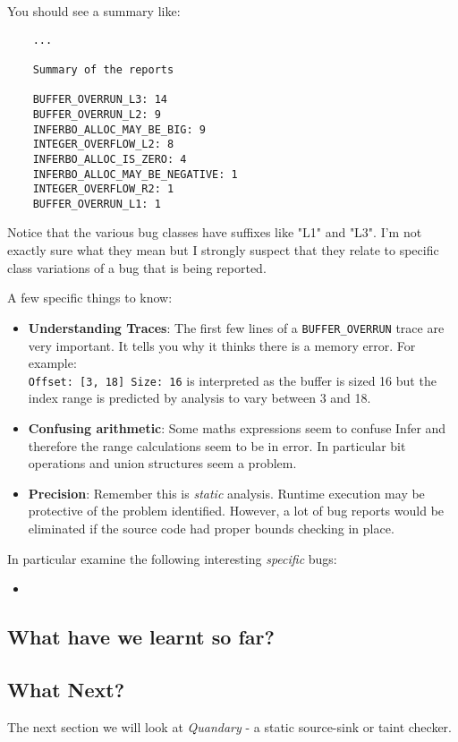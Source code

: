 You should see a summary like:
\begin{verbatim}
	...	
	
	Summary of the reports
	
	BUFFER_OVERRUN_L3: 14
	BUFFER_OVERRUN_L2: 9
	INFERBO_ALLOC_MAY_BE_BIG: 9
	INTEGER_OVERFLOW_L2: 8
	INFERBO_ALLOC_IS_ZERO: 4
	INFERBO_ALLOC_MAY_BE_NEGATIVE: 1
	INTEGER_OVERFLOW_R2: 1
	BUFFER_OVERRUN_L1: 1	
\end{verbatim}

Notice that the various bug classes have suffixes like "L1" and "L3". 
I'm not exactly sure what they mean but I strongly suspect that they relate 
to specific class variations of a bug that is being reported.

A few specific things to know:
\begin{itemize}
	\itemsep0em
	\item \textbf{Understanding Traces}: The first few lines of a \verb|BUFFER_OVERRUN| trace are very important. It tells you why it thinks there is a memory error. For example:\\
	\verb|Offset: [3, 18] Size: 16| is interpreted as the buffer is sized 16 but the index range is predicted by analysis to vary between 3 and 18. 
	\item \textbf{Confusing arithmetic}: Some maths expressions seem to confuse Infer and therefore
	the range calculations seem to be in error. In particular bit operations and union structures seem a problem.
	\item \textbf{Precision}: Remember this is \textit{static} analysis. Runtime execution may
	be protective of the problem identified. However, a lot of bug reports would be eliminated if
	the source code had proper bounds checking in place.
\end{itemize}

In particular examine the following interesting \textit{specific} bugs:
\begin{itemize}
	\item {}
\end{itemize}

\subsection{What have we learnt so far?}


\subsection{What Next?}

The next section we will look at \textit{Quandary} - a static source-sink or taint checker.

